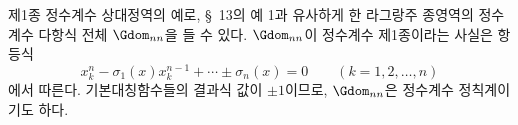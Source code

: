 
제1종 정수계수 상대정역의 예로, \S\ 13의 예 1과 유사하게 한 라그랑주 종영역의 정수계수 다항식 전체 $\Gdom_{nn}$을 들 수 있다. $\Gdom_{nn}$이 정수계수 제1종이라는 사실은 항등식
\[
  x_k^n-\sigma_1(x)x_k^{n-1}+\cdots\pm\sigma_n(x)=0
  \qquad(k=1,2,
\ldots,n)
\]
에서 따른다. 기본대칭함수들의 결과식 값이 $\pm1$이므로, $\Gdom_{nn}$은 정수계수 정칙계이기도 하다.
